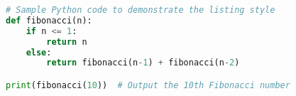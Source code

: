 \documentclass{article}
\begin{document}
\begin{lstlisting}[language=Python, caption={Example Python Code}]
# Sample Python code to demonstrate the listing style
def fibonacci(n):
    if n <= 1:
        return n
    else:
        return fibonacci(n-1) + fibonacci(n-2)

print(fibonacci(10))  # Output the 10th Fibonacci number
\end{lstlisting}
\end{document}
